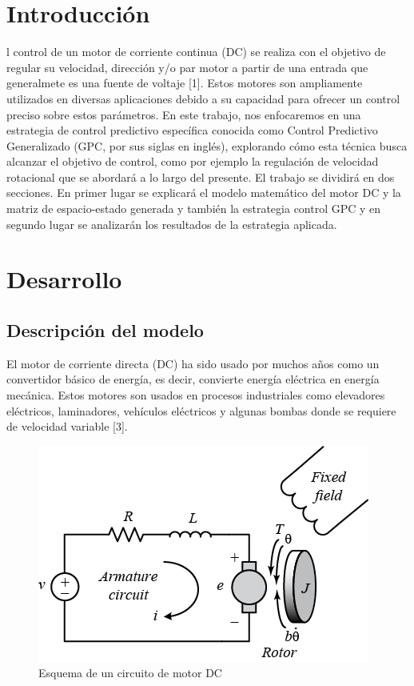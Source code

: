 \documentclass[journal]{IEEEtran}
\begin{document}
\section{Introducción}


l control de un motor de corriente continua (DC) se realiza con el objetivo de regular su velocidad, dirección y/o par motor a partir de una entrada que generalmete es una fuente de voltaje [1]. Estos motores son ampliamente utilizados en diversas aplicaciones debido a su capacidad para ofrecer un control preciso sobre estos parámetros. En este trabajo, nos enfocaremos en una estrategia de control predictivo específica conocida como Control Predictivo Generalizado (GPC, por sus siglas en inglés), explorando cómo esta técnica busca alcanzar el objetivo de control, como por ejemplo la regulación de velocidad rotacional que se abordará a lo largo del presente.
El trabajo se dividirá en dos secciones. En primer lugar se explicará el modelo matemático del motor DC y la matriz de espacio-estado generada y también la estrategia control GPC y en segundo lugar se analizarán los resultados de la estrategia aplicada.



\section{Desarrollo}


\subsection{Descripción del modelo}
El motor de corriente directa (DC) ha sido usado por muchos años como un convertidor básico de energía, es decir, convierte energía eléctrica en energía mecánica. Estos motores son usados en procesos industriales como elevadores eléctricos, laminadores, vehículos eléctricos y algunas bombas donde se requiere de velocidad variable [3].

\begin{figure}[h]
    \centering
    \includegraphics[width=1\linewidth]{motor.png}
    \caption{Esquema de un circuito de motor DC}
    \label{fig:enter-label}
\end{figure}
\end{document}
